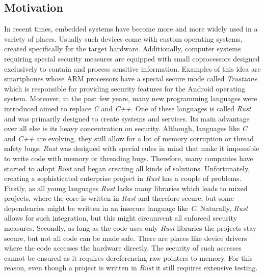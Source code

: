 \subsection{Motivation}
In recent times, embedded systems have become more and more widely used in a variety of places. Usually such devices come with custom operating systems, created specifically for the target hardware. Additionally, computer systems requiring special security measures are equipped with small coprocessors designed exclusively to contain and process sensitive information. Examples of this idea are smartphones whose ARM processors have a special secure mode called \textit{Trustzone} which is responsible for providing security features for the Android operating system. Moreover, in the past few years, many new programming languages were introduced aimed to replace \textit{C} and \textit{C++}. One of these languages is called \textit{Rust} and was primarily designed to create systems and services. Its main advantage over all else is its heavy concentration on security. Although, languages like \textit{C} and \textit{C++} are evolving, they still allow for a lot of memory corruption or thread safety bugs. \textit{Rust} was designed with special rules in mind that make it impossible to write code with memory or threading bugs. Therefore, many companies have started to adopt \textit{Rust} and began creating all kinds of solutions. Unfortunately, creating a sophisticated enterprise project in \textit{Rust} has a couple of problems. Firstly, as all young languages \textit{Rust} lacks many libraries which leads to mixed projects, where the core is written in \textit{Rust} and therefore secure, but some dependencies might be written in an insecure language like \textit{C}. Naturally, \textit{Rust} allows for such integration, but this might circumvent all enforced security measures. Secondly, as long as the code uses only \textit{Rust} libraries the projects stay secure, but not all code can be made safe. There are places like device drivers where the code accesses the hardware directly. The security of such accesses cannot be ensured as it requires dereferencing raw pointers to memory. For this reason, even though a project is written in \textit{Rust} it still requires extensive testing.

